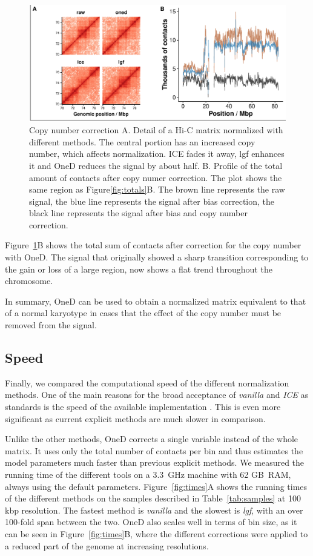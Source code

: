 \documentclass{bioinfo}
\begin{document}
\begin{figure}
\centerline{\includegraphics[width=.5\textwidth]
  {img/figure_cnv_correction.pdf}}
\caption{
Copy number correction A. Detail of a Hi-C matrix normalized with
different methods. The central portion has an increased copy number, which
affects normalization. ICE fades it away, lgf enhances it and OneD reduces
the signal by about half. B. Profile of the total amount of contacts after
copy numer correction. The plot shows the same region as
Figure\ref{fig:totals}B. The brown line represents the raw signal, the
blue line represents the signal after bias correction, the black line
represents the signal after bias and copy number correction.}
\label{fig:cnv_correction}
\end{figure}

Figure~\ref{fig:cnv_correction}B shows the total sum of contacts after
correction for the copy number with OneD. The signal that originally
showed a sharp transition corresponding to the gain or loss of a large
region, now shows a flat trend throughout the chromosome.

In summary, OneD can be used to obtain a normalized matrix equivalent to
that of a normal karyotype in cases that the effect of the copy number
must be removed from the signal.



\subsection{Speed}

Finally, we compared the computational speed of the different
normalization methods. One of the main reasons for the broad acceptance of
\textit{vanilla} and \textit{ICE} as standards is the speed of the
available implementation \citep{imakaev2012iterative}. This is even more
significant as current explicit methods \citep{servant2012hitc} are much
slower in comparison.

Unlike the other methods, OneD corrects a single variable instead of the
whole matrix. It uses only the total number of contacts per bin and thus
estimates the model parameters much faster than previous explicit methods.
We measured the running time of the different tools on a 3.3~GHz machine
with 62 GB~RAM, always using the default parameters. Figure~\ref{fig:times}A
shows the running times of the different methods on the samples described
in Table~\ref{tab:samples} at 100 kbp resolution. The fastest method is
\textit{vanilla} and the slowest is \textit{lgf}, with an over 100-fold
span between the two. OneD also scales well in terms of bin size, as it can
be seen in Figure~\ref{fig:times}B, where the different corrections were
applied to a reduced part of the genome at increasing resolutions.
\end{document}
